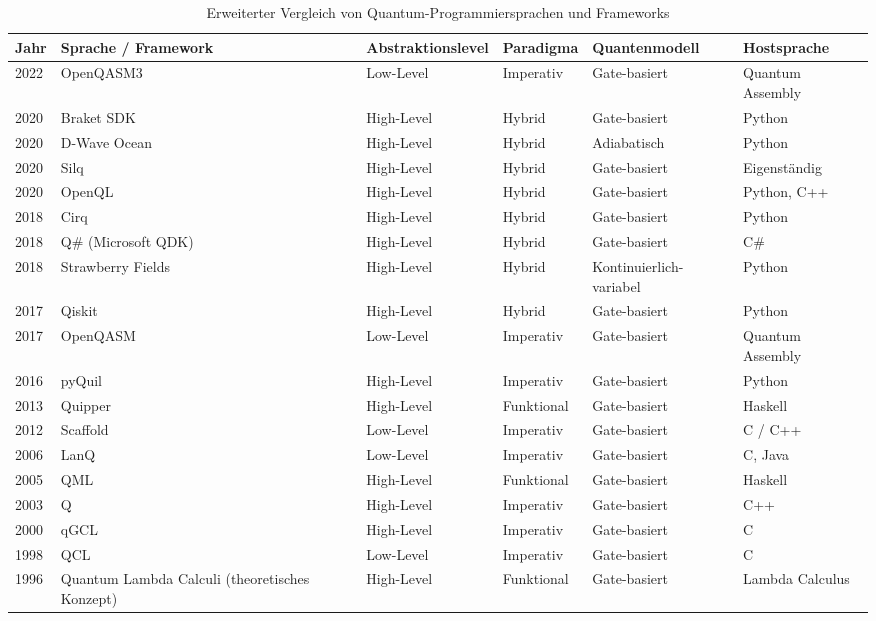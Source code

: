 \begin{table}[H]
\centering
\footnotesize
\begin{tabularx}{\textwidth}{|l|p{2cm}|l|l|l|X|}
\hline
\textbf{Jahr} & 
\textbf{Sprache / Framework} & 
\textbf{Abstraktionslevel} & 
\textbf{Paradigma} & 
\textbf{Quantenmodell} & 
\textbf{Hostsprache} \\
\hline
2022 & OpenQASM3 & Low-Level & Imperativ & Gate-basiert & Quantum Assembly \\
\hline
2020 & Braket SDK & High-Level & Hybrid & Gate-basiert & Python \\
\hline
2020 & D-Wave Ocean & High-Level & Hybrid & Adiabatisch & Python \\
\hline
2020 & Silq & High-Level & Hybrid & Gate-basiert & Eigenständig \\
\hline
2020 & OpenQL & High-Level & Hybrid & Gate-basiert & Python, C++ \\
\hline
2018 & Cirq & High-Level & Hybrid & Gate-basiert & Python \\
\hline
2018 & Q\# (Microsoft QDK) & High-Level & Hybrid & Gate-basiert & C\# \\
\hline
2018 & Strawberry Fields & High-Level & Hybrid & Kontinuierlich-variabel & Python \\
\hline
2017 & Qiskit & High-Level & Hybrid & Gate-basiert & Python \\
\hline
2017 & OpenQASM & Low-Level & Imperativ &  Gate-basiert & Quantum Assembly \\
\hline
2016 & pyQuil & High-Level & Imperativ &  Gate-basiert & Python \\
\hline
2013 & Quipper & High-Level & Funktional & Gate-basiert & Haskell \\
\hline
2012 & Scaffold & Low-Level & Imperativ &  Gate-basiert & C / C++ \\
\hline
2006 & LanQ & Low-Level & Imperativ & Gate-basiert & C, Java \\
\hline
2005 & QML & High-Level & Funktional & Gate-basiert & Haskell \\
\hline
2003 & Q & High-Level & Imperativ & Gate-basiert & C++ \\
\hline
2000 & qGCL & High-Level & Imperativ &  Gate-basiert & C \\
\hline
1998 & QCL & Low-Level & Imperativ & Gate-basiert & C \\
\hline
1996 & Quantum Lambda Calculi (theoretisches Konzept) & High-Level & Funktional & Gate-basiert & Lambda Calculus \\
\hline
\end{tabularx}
\caption{Erweiterter Vergleich von Quantum-Programmiersprachen und Frameworks}
\label{tab:quantum_languages_full}
\end{table}

